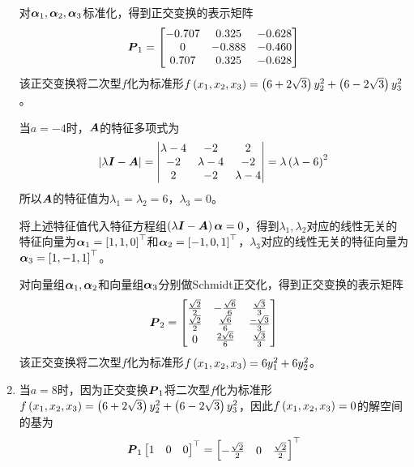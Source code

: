 \documentclass[9pt,xcolor=svgnames]{beamer} %
\begin{document}
\begin{frame}[allowframebreaks]
\begin{enumerate}
{              对\(\boldsymbol{\alpha}_1,\boldsymbol{\alpha}_2,\boldsymbol{\alpha}_3\)标准化，得到正交变换的表示矩阵
              \begin{equation*}
                  \boldsymbol{P}_1=
                  \begin{bmatrix}
                      -0.707 & 0.325  & -0.628 \\
                      0      & -0.888 & -0.460 \\
                      0.707  & 0.325  & -0.628
                  \end{bmatrix}
              \end{equation*}
              该正交变换将二次型\(f\)化为标准形\(f\left( x_1,x_2,x_3 \right)=\left( 6+2\sqrt{3} \right)y_2^2+\left( 6-2\sqrt{3} \right)y_3^2\)。

              当\(a=-4\)时，\(\boldsymbol{A}\)的特征多项式为
              \begin{equation*}
                  \left|\lambda\boldsymbol{I}-\boldsymbol{A} \right|=\begin{vmatrix}\lambda-4&-2&2\\-2&\lambda-4&-2\\2&-2&\lambda-4\end{vmatrix}=\lambda\left( \lambda-6 \right)^2
              \end{equation*}
              所以\(\boldsymbol{A}\)的特征值为\(\lambda_1=\lambda_2=6\)，\(\lambda_3=0\)。

              将上述特征值代入特征方程组\(\left( \lambda\boldsymbol{I}-\boldsymbol{A} \right)\boldsymbol{\alpha}=0\)，得到\(\lambda_1,\lambda_2\)对应的线性无关的特征向量为\(\boldsymbol{\alpha}_1=\left[ 1,1,0 \right]^\top\)和\(\boldsymbol{\alpha}_2=\left[ -1,0,1 \right]^\top\)，\(\lambda_3\)对应的线性无关的特征向量为\(\boldsymbol{\alpha}_3=\left[ 1,-1,1 \right]^\top\)。

              对向量组\(\boldsymbol{\alpha}_1,\boldsymbol{\alpha}_2\)和向量组\(\boldsymbol{\alpha}_3\)分别做Schmidt正交化，得到正交变换的表示矩阵
              \begin{equation*}
                  \boldsymbol{P}_2=
                  \begin{bmatrix}
                      \frac{\sqrt{2}}{2} & -\frac{\sqrt{6}}{6} & \frac{\sqrt{3}}{3}  \\
                      \frac{\sqrt{2}}{2} & \frac{\sqrt{6}}{6}  & \frac{-\sqrt{3}}{3} \\
                      0                  & \frac{2\sqrt{6}}{6} & \frac{\sqrt{3}}{3}
                  \end{bmatrix}
              \end{equation*}
              该正交变换将二次型\(f\)化为标准形\(f\left( x_1,x_2,x_3 \right)=6y_1^2+6y_2^2\)。
              }
        \item {
              当\(a=8\)时，因为正交变换\(\boldsymbol{P}_1\)将二次型\(f\)化为标准形\(f\left( x_1,x_2,x_3 \right)=\left( 6+2\sqrt{3} \right)y_2^2+\left( 6-2\sqrt{3} \right)y_3^2\)，因此\(f\left( x_1,x_2,x_3 \right)=0\)的解空间的基为
              \begin{equation*}
                  \boldsymbol{P}_1\begin{bmatrix}1&0&0\end{bmatrix}^\top=\begin{bmatrix}-\frac{\sqrt{2}}{2}&0&\frac{\sqrt{2}}{2}\end{bmatrix}^\top
              \end{equation*}

}
\end{enumerate}
\end{frame}
\end{document}
